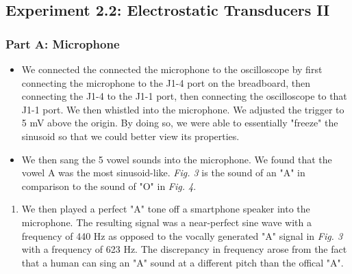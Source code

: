 \documentclass[10pt]{article}
\begin{document}
\subsection{Experiment 2.2: Electrostatic Transducers II}
\subsubsection{Part A: Microphone}
\begin{itemize}
	\item We connected the connected the microphone to the oscilloscope by first connecting the microphone to the J1-4 port on the breadboard, then connecting the J1-4 to the J1-1 port, then connecting the oscilloscope to that J1-1 port. We then whistled into the microphone. We adjusted the trigger to 5 mV above the origin. By doing so, we were able to essentially "freeze" the sinusoid so that we could better view its properties. 
	\item We then sang the 5 vowel sounds into the microphone. We found that the vowel A was the most sinusoid-like. \textit{Fig. 3} is the sound of an "A" in comparison to the sound of "O" in \textit{Fig. 4}. 
\end{itemize}

\begin{enumerate}
	\item  We then played a perfect "A" tone off a smartphone speaker into the microphone. The resulting signal was a near-perfect sine wave with a frequency of 440 Hz as opposed to the vocally generated "A" signal in \textit{Fig. 3} with a frequency of 623 Hz. The discrepancy in frequency arose from the fact that a human can sing an "A" sound at a different pitch than the offical "A". 
\end{enumerate}
\end{document}
